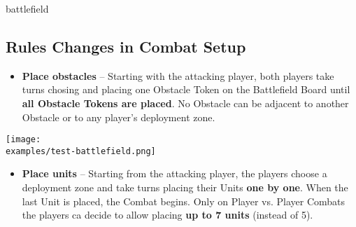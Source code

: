\begin{expansion}{battlefield}
\begin{multicols*}{2}
  \subsection*{Rules Changes in Combat Setup}
  \begin{itemize}
  	\item \textbf{Place obstacles} – Starting with the attacking player, both players take turns chosing and placing one Obstacle Token on the Battlefield Board until \textbf{all Obstacle Tokens are placed}. No Obstacle can be adjacent to another Obstacle or to any player's deployment zone.
  \end{itemize}
  	\texttt{[image: \\examples/test-battlefield.png]}
  \begin{itemize}
  	\item \textbf{Place units}  – Starting from the attacking player, the players choose a deployment zone and take turns placing their Units \textbf{one by one}. When the last Unit is placed, the Combat begins. Only on Player vs. Player Combats the players ca decide to allow placing \textbf{up to 7 units} (instead of 5).
  \end{itemize}
  \end{multicols*}
\end{expansion}

